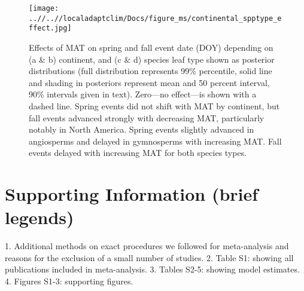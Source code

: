 \documentclass{article}
\begin{document}
\begin{figure}[!h] 
    \centering
 \texttt{[image: ..//..//localadaptclim/Docs/figure\_ms/continental\_spptype\_effect.jpg]}
    \caption{Effects of MAT on spring and fall event date (DOY) depending on (a \& b) continent, and (c \& d) species leaf type shown as posterior distributions (full distribution represents 99\% percentile, solid line and shading in posteriors represent mean and 50 percent interval, 90\% intervals given in text). Zero---no effect---is shown with a dashed line. Spring events did not shift with MAT by continent, but fall events advanced strongly with decreasing MAT, particularly notably in North America. Spring events slightly advanced in angiosperms and delayed in gymnosperms with increasing MAT. Fall events delayed with increasing MAT for both species types.}
    \label{figure:continental_spptype_effect}
\end{figure}



\section{Supporting Information (brief legends)}

1. Additional methods on exact procedures we followed for meta-analysis
and reasons for the exclusion of a small number of studies.
2. Table S1: showing all publications included in meta-analysis.
3. Tables S2-5: showing model estimates.
4. Figures S1-3: supporting figures.
\end{document}
